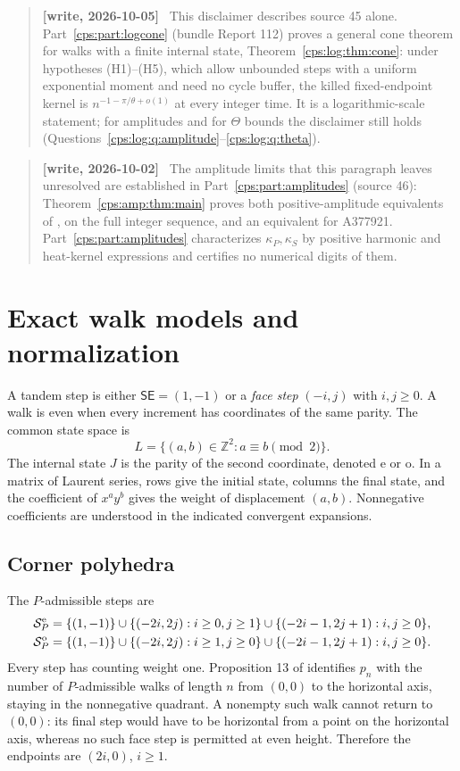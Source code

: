 \documentclass[11pt,letterpaper]{article}
\numberwithin{equation}{section}
\theoremstyle{remark}\newtheorem{remark}[theorem]{Remark}
\newcommand{\ZZ}{\mathbb Z}
\newcommand{\SE}{\mathsf{SE}}
\newcommand{\e}{\mathrm e}
\newcommand{\oState}{\mathrm o}
\newenvironment{writenote}{\begin{quote}\small\sloppy\textbf{[write, 2026-10-02]}\ }{\end{quote}}
\newenvironment{writenotelog}{\begin{quote}\small\sloppy\textbf{[write, 2026-10-05]}\ }{\end{quote}}
\begin{document}
\begin{writenotelog}
This disclaimer describes source 45 alone. Part~\ref{cps:part:logcone} (bundle Report 112) proves
a general cone theorem for walks with a finite internal state, Theorem~\ref{cps:log:thm:cone}:
under hypotheses (H1)--(H5), which allow unbounded steps with a uniform exponential moment and need
no cycle buffer, the killed fixed-endpoint kernel is $n^{-1-\pi/\theta+o(1)}$ at every integer
time. It is a logarithmic-scale statement; for amplitudes and for $\Theta$ bounds the disclaimer
still holds (Questions~\ref{cps:log:q:amplitude}--\ref{cps:log:q:theta}).
\end{writenotelog}

\begin{writenote}
The amplitude limits that this paragraph leaves unresolved are established in
Part~\ref{cps:part:amplitudes} (source 46): Theorem~\ref{cps:amp:thm:main} proves both
positive-amplitude equivalents of \cite[Conjecture 25]{FNS}, on the full integer sequence, and
an equivalent for A377921. Part~\ref{cps:part:amplitudes} characterizes $\kappa_P,\kappa_S$ by
positive harmonic and heat-kernel expressions and certifies no numerical digits of them.
\end{writenote}

\section{Exact walk models and normalization}\label{cps:sec:models}
A tandem step is either $\SE=(1,-1)$ or a \emph{face step} $(-i,j)$ with $i,j\ge0$. A walk is even when every increment has coordinates of the same parity. The common state space is
\begin{equation}\label{cps:eq:lattice}
 L=\{(a,b)\in\ZZ^2:a\equiv b\pmod2\}.
\end{equation}
The internal state $J$ is the parity of the second coordinate, denoted $\e$ or $\oState$. In a matrix of Laurent series, rows give the initial state, columns the final state, and the coefficient of $x^ay^b$ gives the weight of displacement $(a,b)$. Nonnegative coefficients are understood in the indicated convergent expansions.

\subsection{Corner polyhedra}
The $P$-admissible steps are
\begin{align}
 \mathcal S_P^{\e}
 &=\{(1,-1)\}\cup\{(-2i,2j):i\ge0,j\ge1\}
       \cup\{(-2i-1,2j+1):i,j\ge0\},\label{cps:eq:Psteps}\\
 \mathcal S_P^{\oState}
 &=\{(1,-1)\}\cup\{(-2i,2j):i\ge1,j\ge0\}
       \cup\{(-2i-1,2j+1):i,j\ge0\}.\notag
\end{align}
Every step has counting weight one. Proposition 13 of \cite{FNS} identifies $p_n$ with the number of $P$-admissible walks of length $n$ from $(0,0)$ to the horizontal axis, staying in the nonnegative quadrant. A nonempty such walk cannot return to $(0,0)$: its final step would have to be horizontal from a point on the horizontal axis, whereas no such face step is permitted at even height. Therefore the endpoints are $(2i,0)$, $i\ge1$.
\end{document}
